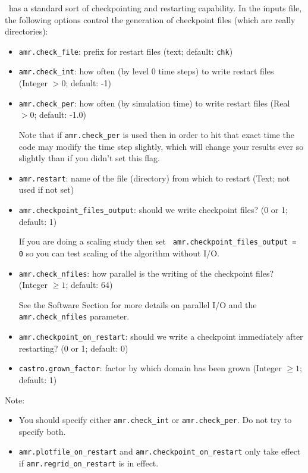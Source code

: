\castro\ has a standard sort of checkpointing and restarting capability. 
In the inputs file, the following options control the generation of
checkpoint files (which are really directories):
\begin{itemize}
\item {\tt amr.check\_file}: prefix for restart files (text; default: {\tt chk}) 

\item {\tt amr.check\_int}: how often (by level 0 time steps) to write
   restart files (Integer $> 0$; default: -1)

\item {\tt amr.check\_per}: how often (by simulation time) to
  write restart files (Real $> 0$; default: -1.0)

  Note that if {\tt amr.check\_per} is used then in order to hit that
exact time the code may modify the time step slightly, which will
change your results ever so slightly than if you didn't set this flag.

\item {\tt amr.restart}: name of the file (directory) from which to restart
  (Text; not used if not set)

\item {\tt amr.checkpoint\_files\_output}: should we write checkpoint files? (0 or 1; default: 1)

  If you are doing a scaling study then set {\tt
  amr.checkpoint\_files\_output = 0} so you can test scaling of the
  algorithm without I/O.

\item {\tt amr.check\_nfiles}: how parallel is the writing of the checkpoint files?
  (Integer $\geq 1$; default: 64)

  See the Software Section for more details on parallel I/O and the 
  {\tt amr.check\_nfiles} parameter.

\item {\tt amr.checkpoint\_on\_restart}: should we write a checkpoint immediately after restarting?
  (0 or 1; default: 0)

\item {\tt castro.grown\_factor}: factor by which domain has been grown
  (Integer $\geq 1$; default: 1)
\end{itemize}


Note:
\begin{itemize}

\item You should specify either {\tt amr.check\_int} or {\tt amr.check\_per}.
  Do not try to specify both. 

\item {\tt amr.plotfile\_on\_restart} and {\tt amr.checkpoint\_on\_restart} 
only take effect if {\tt amr.regrid\_on\_restart} is in effect.
\end{itemize}

